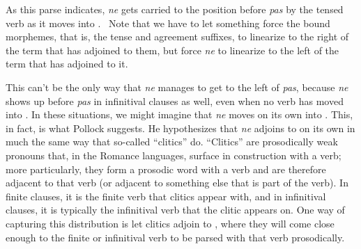 As this parse indicates, \emph{ne} gets carried to the position before \emph{pas} by the tensed verb as it moves into .%
%
%
%
\ Note that we have to let something force the bound morphemes, that is, the tense and agreement suffixes, to linearize to the right of the term that has adjoined to them, but force \emph{ne} to linearize to the left of the term that has adjoined to it.

This can't be the only way that \emph{ne} manages to get to the left of \emph{pas}, because \emph{ne} shows up before \emph{pas} in infinitival clauses as well, even when no verb has moved into . In these situations, we might imagine that \emph{ne} moves on its own into . This, in fact, is what Pollock suggests. He hypothesizes that \emph{ne} adjoins to  on its own in much the same way that so-called ``clitics'' do. ``Clitics'' are prosodically weak pronouns that, in the Romance languages, surface in construction with a verb; more particularly, they form a prosodic word with a verb and are therefore adjacent to that verb (or adjacent to something else that is part of the verb). In finite clauses, it is the finite verb that clitics appear with, and in infinitival clauses, it is typically the infinitival verb that the clitic appears on. One way of capturing this distribution is let clitics adjoin to , where they will come close enough to the finite or infinitival verb to be parsed with that verb prosodically.

